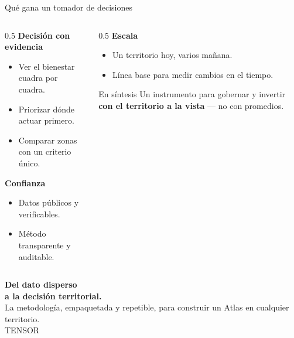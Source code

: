\documentclass[aspectratio=169,11pt]{beamer}
\begin{document}
\begin{frame}{Qué gana un tomador de decisiones}
\begin{columns}[T]
\begin{column}{0.5\textwidth}
\textbf{\color{tAccent}Decisión con evidencia}
\begin{itemize}\footnotesize
  \item Ver el bienestar cuadra por cuadra.
  \item Priorizar dónde actuar primero.
  \item Comparar zonas con un criterio único.
\end{itemize}
\medskip
\textbf{\color{tAccent}Confianza}
\begin{itemize}\footnotesize
  \item Datos públicos y verificables.
  \item Método transparente y auditable.
\end{itemize}
\end{column}
\begin{column}{0.5\textwidth}
\textbf{\color{tAccent}Escala}
\begin{itemize}\footnotesize
  \item Un territorio hoy, varios mañana.
  \item Línea base para medir cambios en el tiempo.
\end{itemize}
\medskip
\begin{block}{En síntesis}
Un instrumento para gobernar y invertir \textbf{con el territorio a la vista} — no con promedios.
\end{block}
\end{column}
\end{columns}
\end{frame}

{
\begin{frame}[plain]
\vspace{1.8cm}
{\color{tPrimary}\Huge\bfseries Del dato disperso\\ a la decisión territorial.}\\[0.8em]
{\color{tBody}\large La metodología, empaquetada y repetible, para construir un Atlas en cualquier territorio.}\\[1.6cm]
{\color{tAccentD}\ttfamily\small TENSOR}
\end{frame}}
\end{document}
